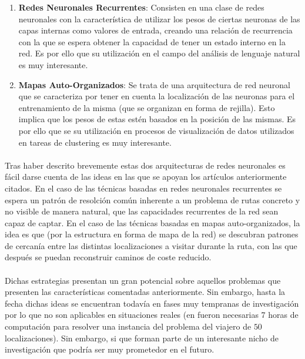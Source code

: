 \documentclass{subfiles}
\begin{document}
        \begin{enumerate}

            \item \textbf{Redes Neuronales Recurrentes}: Consisten en una clase de redes neuronales con la característica de utilizar los pesos de ciertas neuronas de las capas internas como valores de entrada, creando una relación de recurrencia con la que se espera obtener la capacidad de tener un estado interno en la red. Es por ello que su utilización en el campo del análisis de lenguaje natural es muy interesante.

            \item \textbf{Mapas Auto-Organizados}: Se trata de una arquitectura de red neuronal que se caracteriza por tener en cuenta la localización de las neuronas para el entrenamiento de la misma (que se organizan en forma de rejilla). Esto implica que los pesos de estas estén basados en la posición de las mismas. Es por ello que se su utilización en procesos de visualización de datos utilizados en tareas de clustering es muy interesante.

        \end{enumerate}

        \paragraph{}
        Tras haber descrito brevemente estas dos arquitecturas de redes neuronales es fácil darse cuenta de las ideas en las que se apoyan los artículos anteriormente citados. En el caso de las técnicas basadas en redes neuronales recurrentes se espera  un patrón de resolción común inherente a un problema de rutas concreto y no visible de manera natural, que las capacidades recurrentes de la red sean capaz de captar. En el caso de las técnicas basadas en mapas auto-organizados, la idea es que (por la estructura en forma de mapa de la red) se descubran patrones de cercanía entre las distintas localizaciones a visitar durante la ruta, con las que después se puedan reconstruir caminos de coste reducido.

        \paragraph{}
        Dichas estrategias presentan un gran potencial sobre aquellos problemas que presenten las características comentadas anteriormente. Sin embargo, hasta la fecha dichas ideas se encuentran todavía en fases muy tempranas de investigación por lo que no son aplicables en situaciones reales (en \cite{bello2016neural} fueron necesarias 7 horas de computación para resolver una instancia del problema del viajero de $50$ localizaciones). Sin embargo, si que forman parte de un interesante nicho de investigación que podría ser muy prometedor en el futuro.
\end{document}
